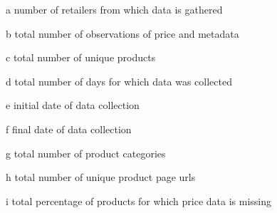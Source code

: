 \begin{table}
{\begin{threeparttable}
    \begin{tablenotes}
      \small
      \item[a] number of retailers from which data is gathered 
      \item[b] total number of observations of price and metadata 
      \item[c] total number of unique products 
      \item[d] total number of days for which data was collected 
      \item[e] initial date of data collection 
      \item[f] final date of data collection 
      \item[g] total number of product categories 
      \item[h] total number of unique product page urls 
      \item[i] total percentage of products for which price data is missing 
    \end{tablenotes}
  \end{threeparttable}
  }
\end{table}
\label{table:cavallo1}


